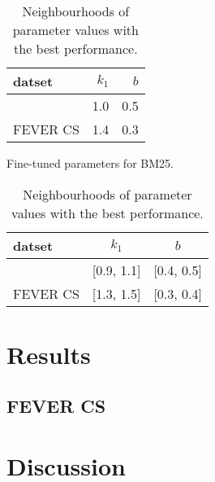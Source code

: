 \begin{table}[!htb]
    \centering
    \begin{minipage}[t]{.47\textwidth}    
        \centering
        \begin{tabular}{lrr}
            datset & $k_1$ & $b$ \\
            \midrule
            \CTK{} & 1.0 & 0.5 \\
            FEVER CS & 1.4 & 0.3
        \end{tabular}
        \caption[BM25 Fine-tuned Parameters]{Fine-tuned parameters for BM25.}
        \label{tab:bm25_finetune}
    \end{minipage}
    \hfill
    \begin{minipage}[t]{.47\textwidth}
        \centering
        \begin{tabular}{lcc}
            datset & $k_1$ & $b$ \\
            \midrule
            \CTK{} & [0.9, 1.1] & [0.4, 0.5] \\
            FEVER CS & [1.3, 1.5] & [0.3, 0.4]
        \end{tabular}
        \caption[BM25 Promising Parameter Sets]{Neighbourhoods of parameter values with the best performance.}
        \label{tab:bm25_sets}
    \end{minipage}
\end{table}

\section{Results}
\subsection{\CTK}
\subsection{FEVER CS}

\section{Discussion}